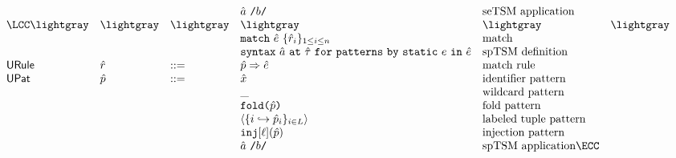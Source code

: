 \[\begin{array}{lllllll}
&&
& \utsmap{\tsmv}{b} & \text{seTSM application}\\%
\LCC  \lightgray & \lightgray & \lightgray
& \lightgray 
& \lightgray & \lightgray \\
&&
& \matchwith{\ue}{\seqschemaX{\urv}} & \text{match}\\
&&
& \usyntaxup{\tsmv}{\utau}{e}{\ue}
& \text{spTSM definition}\\
\mathsf{URule} & \urv & ::= 
& \matchrule{\upv}{\ue} & \text{match rule}\\
\mathsf{UPat} & \upv & ::= 
& \ux & \text{identifier pattern}\\
&&
& \wildp & \text{wildcard pattern}\\
&&
& \foldp{\upv} & \text{fold pattern}\\
&&
& \tplp{\mapschema{\upv}{i}{\labelset}} & \text{labeled tuple pattern}\\
&&
& \injp{\ell}{\upv} & \text{injection pattern}\\
&&
& \utsmap{\tsmv}{b} & \text{spTSM application}\ECC
\end{array}\]

\clearpage


